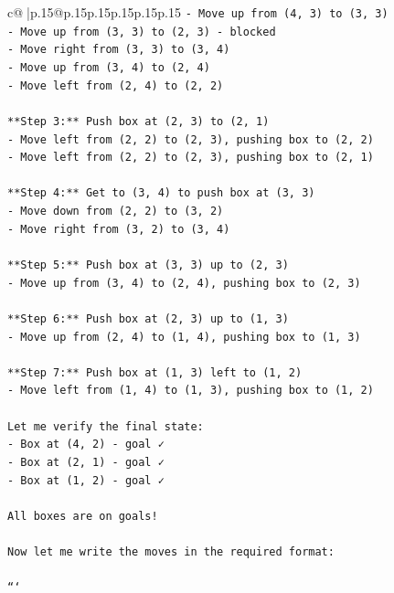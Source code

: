\documentclass{article}
\begin{document}
{\begin{supertabular}{c@{$\;$}|p{.15\linewidth}@{}p{.15\linewidth}p{.15\linewidth}p{.15\linewidth}p{.15\linewidth}p{.15\linewidth}}
{{{\texttt{{-} Move up from (4, 3) to (3, 3)} \\
\texttt{{-} Move up from (3, 3) to (2, 3) {-} blocked} \\
\texttt{{-} Move right from (3, 3) to (3, 4)} \\
\texttt{{-} Move up from (3, 4) to (2, 4)} \\
\texttt{{-} Move left from (2, 4) to (2, 2)} \\
\\ 
\texttt{**Step 3:** Push box at (2, 3) to (2, 1)} \\
\texttt{{-} Move left from (2, 2) to (2, 3), pushing box to (2, 2)} \\
\texttt{{-} Move left from (2, 2) to (2, 3), pushing box to (2, 1)} \\
\\ 
\texttt{**Step 4:** Get to (3, 4) to push box at (3, 3)} \\
\texttt{{-} Move down from (2, 2) to (3, 2)} \\
\texttt{{-} Move right from (3, 2) to (3, 4)} \\
\\ 
\texttt{**Step 5:** Push box at (3, 3) up to (2, 3)} \\
\texttt{{-} Move up from (3, 4) to (2, 4), pushing box to (2, 3)} \\
\\ 
\texttt{**Step 6:** Push box at (2, 3) up to (1, 3)} \\
\texttt{{-} Move up from (2, 4) to (1, 4), pushing box to (1, 3)} \\
\\ 
\texttt{**Step 7:** Push box at (1, 3) left to (1, 2)} \\
\texttt{{-} Move left from (1, 4) to (1, 3), pushing box to (1, 2)} \\
\\ 
\texttt{Let me verify the final state:} \\
\texttt{{-} Box at (4, 2) {-} goal ✓} \\
\texttt{{-} Box at (2, 1) {-} goal ✓} \\
\texttt{{-} Box at (1, 2) {-} goal ✓} \\
\\ 
\texttt{All boxes are on goals!} \\
\\ 
\texttt{Now let me write the moves in the required format:} \\
\\ 
\texttt{```} \\
}}}
\end{supertabular}}
\end{document}
